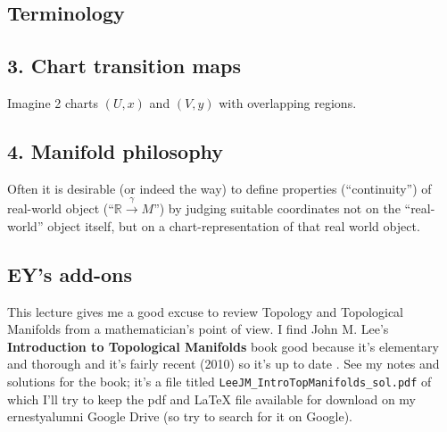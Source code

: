 \documentclass[10pt, twoside]{amsart}
\begin{document}
\begin{multicols*}{2}
\subsection{Terminology}

\subsection{3. Chart transition maps}

Imagine 2 charts $(U,x)$ and $(V,y)$ with overlapping regions.  

\subsection{4. Manifold philosophy}

Often it is desirable (or indeed the way) to define properties (``continuity'') of real-world object (``$\mathbb{R}\xrightarrow{ \gamma } M$'') by judging suitable coordinates not on the ``real-world'' object itself, but on a chart-representation of that real world object.  

\subsection*{EY's add-ons}

This lecture gives me a good excuse to review Topology and Topological Manifolds from a mathematician's point of view.  I find John M. Lee's \textbf{Introduction to Topological Manifolds} book good because it's elementary and thorough and it's fairly recent (2010) so it's up to date \cite{JMLee2010}.  See my notes and solutions for the book; it's a file titled \verb|LeeJM_IntroTopManifolds_sol.pdf| of which I'll try to keep the pdf and LaTeX file available for download on my ernestyalumni Google Drive (so try to search for it on Google).  



\end{multicols*}
\end{document}
